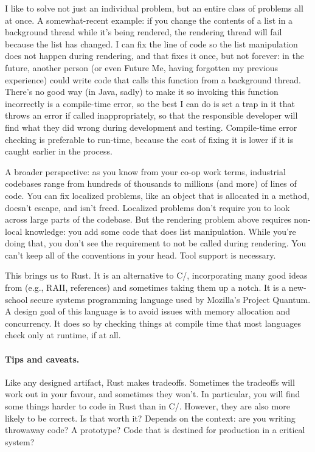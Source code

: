 I like to solve not just an individual problem, but an entire class of problems all at once. A somewhat-recent example: if you change the contents of a list in a background thread while it's being rendered, the rendering thread will fail because the list has changed. I can fix the line of code so the list manipulation does not happen during rendering, and that fixes it once, but not forever: in the future, another person (or even Future Me, having forgotten my previous experience) could write code that calls this function from a background thread. There's no good way (in Java, sadly) to make it so invoking this function incorrectly is a compile-time error, so the best I can do is set a trap in it that throws an error if called inappropriately, so that the responsible developer will find what they did wrong during development and testing. Compile-time error checking is preferable to run-time, because the cost of fixing it is lower if it is caught earlier in the process.

A broader perspective: as you know from your co-op work terms, industrial codebases range from hundreds of thousands to millions (and more) of lines of code. You can fix localized problems, like an object that is allocated in a method, doesn't escape, and isn't freed. Localized problems don't require you to look across large parts of the codebase. But the rendering problem above requires non-local knowledge: you add some code that does list manipulation. While you're doing that, you don't see the requirement to not be called during rendering. You can't keep all of the conventions in your head. Tool support is necessary.

This brings us to Rust. It is an alternative to C/\CPP, incorporating many good ideas from \CPP (e.g., RAII, references) and sometimes taking them up a notch. It is a new-school
secure systems programming language used by Mozilla's Project Quantum. A design goal of this language is to avoid issues with memory allocation and concurrency. It does so by checking things at compile time that most languages check only at runtime, if at all.

\paragraph{Tips and caveats.}
Like any designed artifact, Rust makes tradeoffs. Sometimes the tradeoffs will work out in your favour, and sometimes they won't. In particular, you will find some things harder to code in Rust than in C/\CPP. However, they are also more likely to be correct. Is that worth it? Depends on the context: are you writing throwaway code? A prototype? Code that is destined for production in a critical system?

